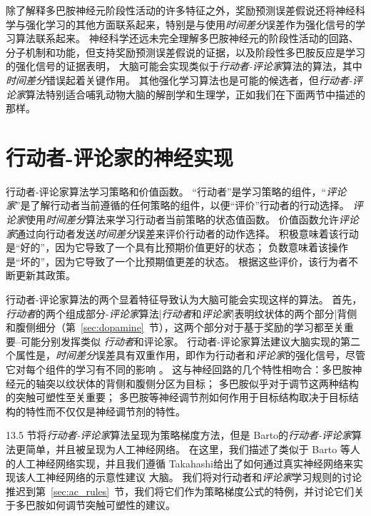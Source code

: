 除了解释多巴胺神经元阶段性活动的许多特征之外，奖励预测误差假说还将神经科学与强化学习的其他方面联系起来，特别是与使用\textit{时间差分}误差作为强化信号的学习算法联系起来。
神经科学还远未完全理解多巴胺神经元的阶段性活动的回路、分子机制和功能，但支持奖励预测误差假说的证据，以及阶段性多巴胺反应是学习的强化信号的证据表明， 大脑可能会实现类似于\textit{行动者-评论家}算法的算法，其中\textit{时间差分}错误起着关键作用。
其他强化学习算法也是可能的候选者，但\textit{行动者-评论家}算法特别适合哺乳动物大脑的解剖学和生理学，正如我们在下面两节中描述的那样。



\section{行动者-评论家的神经实现} \label{sec:neural_ac}

行动者-评论家算法学习策略和价值函数。
“行动者”是学习策略的组件，“\textit{评论家}”是了解行动者当前遵循的任何策略的组件，以便“评价”行动者的行动选择。
\textit{评论家}使用\textit{时间差分}算法来学习行动者当前策略的状态值函数。
价值函数允许\textit{评论家}通过向行动者发送\textit{时间差分}误差来评价行动者的动作选择。
积极意味着该行动是“好的”，因为它导致了一个具有比预期价值更好的状态；
负数意味着该操作是“坏的”，因为它导致了一个比预期值更差的状态。
根据这些评价，该行为者不断更新其政策。


行动者-评论家算法的两个显着特征导致认为大脑可能会实现这样的算法。
首先，\textit{行动者}的两个组成部分-\textit{评论家}算法|\textit{行动者}和\textit{评论家}|表明纹状体的两个部分|背侧和腹侧细分（第~\ref{sec:dopamine}~节），这两个部分对于基于奖励的学习都至关重要--可能分别发挥类似 \textit{行动者}和评论家。
行动者-评论家算法建议大脑实现的第二个属性是，\textit{时间差分}误差具有双重作用，即作为行动者和\textit{评论家}的强化信号，尽管它对每个组件的学习有不同的影响 。
这与神经回路的几个特性相吻合：多巴胺神经元的轴突以纹状体的背侧和腹侧分区为目标；
多巴胺似乎对于调节这两种结构的突触可塑性至关重要；
多巴胺等神经调节剂如何作用于目标结构取决于目标结构的特性而不仅仅是神经调节剂的特性。


13.5 节将\textit{行动者-评论家}算法呈现为策略梯度方法，但是 Barto\cite{barto13neuron}的\textit{行动者-评论家}算法更简单，并且被呈现为人工神经网络。
在这里，我们描述了类似于 Barto 等人的人工神经网络实现，并且我们遵循 Takahashi\cite{takahashi2008silencing}给出了如何通过真实神经网络来实现该人工神经网络的示意性建议 大脑。
我们将对行动者和\textit{评论家}学习规则的讨论推迟到第~\ref{sec:ac_rules}~节，我们将它们作为策略梯度公式的特例，并讨论它们关于多巴胺如何调节突触可塑性的建议。


